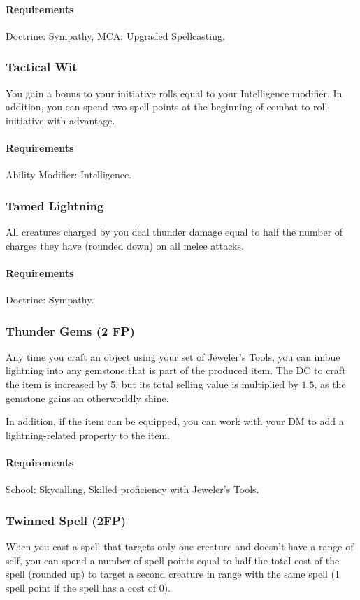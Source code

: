     \paragraph{Requirements} Doctrine: Sympathy, MCA: Upgraded Spellcasting.
\subsubsection{Tactical Wit} \label{feat::tacticalwit}
    You gain a bonus to your initiative rolls equal to your Intelligence modifier.
    In addition, you can spend two spell points at the beginning of combat to roll initiative with advantage.
    \paragraph{Requirements} Ability Modifier: Intelligence.
\subsubsection{Tamed Lightning} \label{feat::tamedlightning}
    All creatures charged by you deal thunder damage equal to half the number of charges they have (rounded down) on all melee attacks.
    \paragraph{Requirements} Doctrine: Sympathy.
\subsubsection{Thunder Gems (2 FP)} \label{feat::thundergems}
    Any time you craft an object using your set of Jeweler's Tools, you can imbue lightning into any gemstone that is part of the produced item.
    The DC to craft the item is increased by 5, but its total selling value is multiplied by $1.5$, as the gemstone gains an otherworldly shine.

    In addition, if the item can be equipped, you can work with your DM to add a lightning-related property to the item.
    \paragraph{Requirements} School: Skycalling, Skilled proficiency with Jeweler's Tools.
\subsubsection{Twinned Spell (2FP)} \label{feat::twinnedspell}
    When you cast a spell that targets only one creature and doesn't have a range of self, you can spend a number of spell points equal to half the total cost of the spell (rounded up) to target a second creature in range with the same spell (1 spell point if the spell has a cost of 0).

